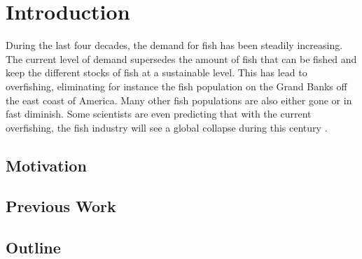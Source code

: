 
\chapter{Introduction}
During the last four decades, the demand for fish 
has been steadily increasing. The current level 
of demand supersedes the amount of fish that 
can be fished and keep the different stocks of 
fish at a sustainable level. This has lead to 
overfishing, eliminating for instance the 
fish population on the Grand Banks off the east 
coast of America. Many other fish 
populations are also either gone or in fast 
diminish. Some scientists are even predicting 
that with the current overfishing, the fish industry will 
see a global collapse during this century \citet{worm06}.


\section{Motivation}


\section{Previous Work}


\section{Outline}

